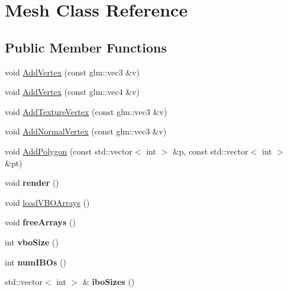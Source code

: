 \hypertarget{classMesh}{\section{Mesh Class Reference}
\label{classMesh}
}
\subsection*{Public Member Functions}
\begin{DoxyCompactItemize}
\item 
void \hyperlink{classMesh_a057b3461e646a8a022f9989b3014194e}{Add\-Vertex} (const glm\-::vec3 \&v)
\item 
void \hyperlink{classMesh_aa8b8eead3d37411bd91a24417b300148}{Add\-Vertex} (const glm\-::vec4 \&v)
\item 
void \hyperlink{classMesh_a0737fe043d4c8f9d5b83ca0ea89a1cfc}{Add\-Texture\-Vertex} (const glm\-::vec3 \&v)
\item 
void \hyperlink{classMesh_aba5bf035eafa537adeae5f3bc0804ff4}{Add\-Normal\-Vertex} (const glm\-::vec3 \&v)
\item 
void \hyperlink{classMesh_a67fae480eb46255053a3dd08d44522da}{Add\-Polygon} (const std\-::vector$<$ int $>$ \&p, const std\-::vector$<$ int $>$ \&pt)
\item 
\hypertarget{classMesh_aa196429f3e87ecd53e8770ba979222f4}{void {\bfseries render} ()}\label{classMesh_aa196429f3e87ecd53e8770ba979222f4}

\item 
void \hyperlink{classMesh_ae22e2d895293ab336df9d118d02548a3}{load\-V\-B\-O\-Arrays} ()
\item 
\hypertarget{classMesh_a7851ef56844e42b5943fe3e44c88416f}{void {\bfseries free\-Arrays} ()}\label{classMesh_a7851ef56844e42b5943fe3e44c88416f}

\item 
\hypertarget{classMesh_a9207d439941d5d12f30d2d2ace000093}{int {\bfseries vbo\-Size} ()}\label{classMesh_a9207d439941d5d12f30d2d2ace000093}

\item 
\hypertarget{classMesh_a5334ea5e7835eae71f8fc7ba5c431818}{int {\bfseries num\-I\-B\-Os} ()}\label{classMesh_a5334ea5e7835eae71f8fc7ba5c431818}

\item 
\hypertarget{classMesh_a29874e1f0dc026ea0501cbabddb6990e}{std\-::vector$<$ int $>$ \& {\bfseries ibo\-Sizes} ()}\label{classMesh_a29874e1f0dc026ea0501cbabddb6990e}


\end{DoxyCompactItemize}
